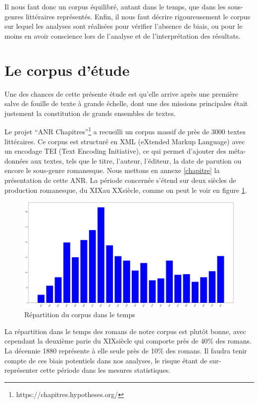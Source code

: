 Il nous faut donc un corpus équilibré, autant dans le temps, que dans les sous-genres littéraires représentés. Enfin, il nous faut décrire rigoureusement le corpus sur lequel les analyses sont réalisées pour vérifier l'absence de biais, ou pour le moins en avoir conscience lors de l'analyse et de l'interprétation des résultats. 

\section{Le corpus d'étude}

Une des chances de cette présente étude est qu'elle arrive après une première salve de fouille de texte à grande échelle, dont une des missions principales était justement la constitution de grands ensembles de textes.    

Le projet \enquote{ANR Chapitres}\footnote{https://chapitres.hypotheses.org/} a recueilli un corpus massif de près de 3000 textes littéraires. Ce corpus est structuré en XML (eXtended Markup Language) avec un encodage TEI (Text Encoding Initiative), ce qui permet d'ajouter des méta-données aux textes, tels que le titre, l'auteur, l'éditeur, la date de parution ou encore le sous-genre romanesque. Nous mettons en annexe \ref{chapitre} la présentation de cette ANR. La période concernée s'étend sur deux siècles de production romanesque, du XIX\ieme au XX\ieme  siècle, comme on peut le voir en figure \ref{corpus_bar}. 

\bigskip
\begin{figure}[!ht]
    \centering
    \includegraphics[width=15cm]{img/01_decades.png}
    \caption{Répartition du corpus dans le temps}
    \label{corpus_bar}
\end{figure}

La répartition dans le temps des romans de notre corpus est plutôt bonne, avec cependant la deuxième parie du XIX\ieme siècle qui comporte près de 40\% des romans. La décennie 1880 représente à elle seule près de 10\% des romans. Il faudra tenir compte de ces biais potentiels dans nos analyses, le risque étant de sur-représenter cette période dans les mesures statistiques. 

